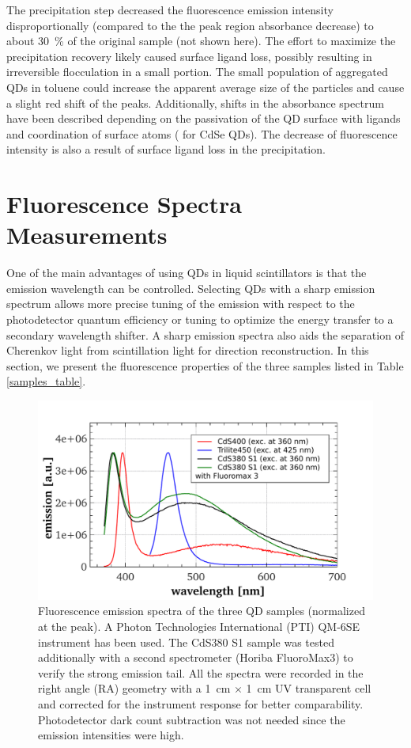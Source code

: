 \documentclass[cits]{JINST}
\begin{document}
The precipitation step decreased the fluorescence emission intensity disproportionally (compared to the the peak region absorbance decrease) to about 30~\% of the original sample (not shown here). The effort to maximize the precipitation recovery likely caused surface ligand loss, possibly resulting in irreversible flocculation in a small portion. The small population of aggregated QDs in toluene could increase the apparent average size of the particles and cause a slight red shift of the peaks. Additionally, shifts in the absorbance spectrum have been described depending on the passivation of the QD surface with ligands and coordination of surface atoms (\cite{inerbaev} for CdSe QDs). The decrease of fluorescence intensity is also a result of surface ligand loss in the precipitation. 

\section{Fluorescence Spectra Measurements}\label{Fluorescence_section}
One of the main advantages of using QDs in liquid scintillators is that the emission wavelength can be controlled. Selecting QDs with a sharp emission spectrum allows more precise tuning of the emission with respect to the photodetector quantum efficiency or tuning to optimize the energy transfer to a secondary wavelength shifter. A sharp emission spectra also aids the separation of Cherenkov light from scintillation light for direction reconstruction. In this section, we present the fluorescence properties of the three samples listed in Table \ref{samples_table}. 

\begin{figure}
      \begin{center}
        \includegraphics[scale=0.42]{graphs/publication_emission_comparison_update.pdf}
        \caption[]{Fluorescence emission spectra of the three QD samples (normalized at the peak). A Photon Technologies International (PTI) QM-6SE instrument has been used. The CdS380 S1 sample was tested additionally with a second spectrometer (Horiba FluoroMax3) to verify the strong emission tail. All the spectra were recorded in the right angle (RA) geometry with a 1~cm $\times$ 1~cm UV transparent cell and corrected for the instrument response for better comparability. Photodetector dark count subtraction was not needed since the emission intensities were high. \label{emission_comp}}
        \end{center}
\end{figure}
\end{document}
